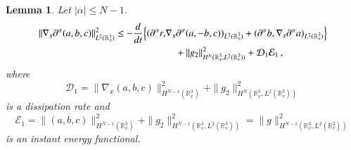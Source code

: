 \documentclass{amsart}[12pt, article]
\newtheorem{lemm}[theo]{Lemma}
\begin{document}
\begin{lemm}
Let $|\alpha|\le N-1$.
\begin{align}\label{pabc}
\|\nabla_x {{\partial}}^\alpha (a, b, c)\|_{L^2({{{\mathbb R}}}^3_x)}^2
\le
-\frac{d}{dt}\Big\{({{\partial}}^\alpha r,&\nabla_x {{\partial}}^\alpha (a, - b, c))_{L^2({{{\mathbb R}}}^3_x)}
+({{\partial}}^\alpha b, \nabla_x {{\partial}}^\alpha a)_{L^2({{{\mathbb R}}}^3_x)}\Big\}
\\&\quad +\notag
 \|g_2\|_{H^{N}({{{\mathbb R}}}^3_x, L^2({{{\mathbb R}}}^3_v))}^2+
\mathcal D_1\mathcal E_1\, ,
\end{align}
where
\[
\mathcal{D}_1=
\|\nabla_x(a,b,c)\|_{H^{N-1}({{{\mathbb R}}}^3_x)}^2+\|g_2\|_{H^{N}({{{\mathbb R}}}^3_x, L^2({{{\mathbb R}}}^3_v))}^2
\]
is a dissipation rate and
\[
\mathcal{E}_1=
\|(a,b,c)\|^2_{H^{N-1}({{{\mathbb R}}}^3_x)}+\|g_2\|_{H^{N-1}({{{\mathbb R}}}^3_x, L^2({{{\mathbb R}}}^3_v))}^2=\|g\|_{H^{N-1}({{{\mathbb R}}}^3_x, L^2({{{\mathbb R}}}^3_v))}^2
\]
is an instant energy functional.
\end{lemm}
\noindent
\end{document}
